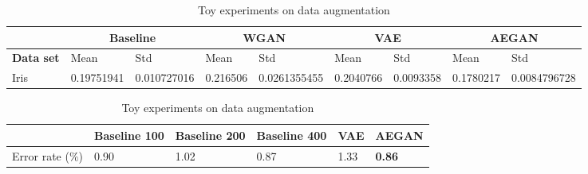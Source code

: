 \begin{table}[t]
    \centering
    \caption{Toy experiments on data augmentation}
    \label{tab:toy_experiments}
    \begin{subtable}{0.9\textwidth}
        \begin{tabular}{|l|ll|ll|ll|ll|}
            \cline{2-9}
            \multicolumn{1}{c|}{ } & \multicolumn{2}{c|}{Baseline} & \multicolumn{2}{c|}{WGAN} & \multicolumn{2}{c|}{VAE} & \multicolumn{2}{c|}{AEGAN} \\ \hline
            \textbf{Data set} & Mean & Std & Mean & Std & Mean & Std & Mean & Std \\ \hline
            Iris & \num{0.19751941} & \num{0.010727016} & \num{0.216506} & \num{0.0261355455} & \num{0.2040766} & \num{0.0093358} & \num{0.1780217} & \num{0.0084796728} \\
            \hline
        \end{tabular}
    \end{subtable}
    \begin{subtable}{0.9\textwidth}
        \begin{tabular}{|l|lll|l|l|}
            \cline{2-6}
            \multicolumn{1}{c|}{} & Baseline 100 & Baseline 200 & Baseline 400 & VAE & AEGAN \\ \hline
            Error rate ($\%$) & \num{0.90} & \num{1.02} & \num{0.87} & \num{1.33} & \textbf{\num{0.86}} \\ \hline
        \end{tabular}
    \end{subtable}
\end{table}


